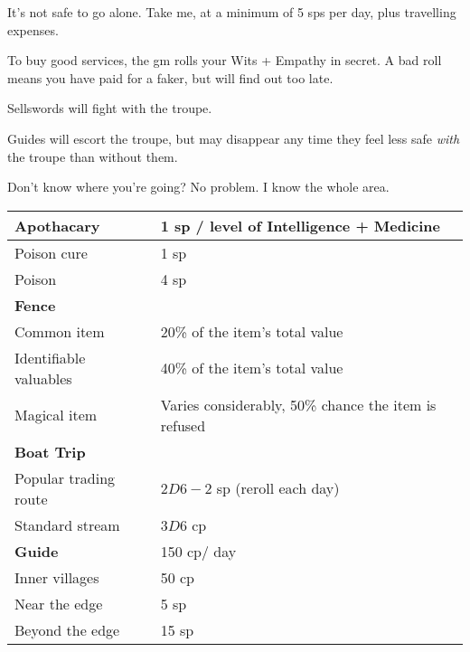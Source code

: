 \begin{multicols}{2}

\begin{boxtext}
  It's not safe to go alone.
  Take me, at a minimum of 5 \glspl{sp} per day, plus travelling expenses.
\end{boxtext}

To buy good services, the \gls{gm} rolls your Wits + Empathy in secret.
A bad roll means you have paid for a faker, but will find out too late.

Sellswords will fight with the troupe.

Guides will escort the troupe, but may disappear any time they feel less safe \emph{with} the troupe than without them.

\begin{boxtext}
  Don't know where you're going?
  No problem.
  I know the whole area.
\end{boxtext}

\noindent
\begin{tabularx}{\linewidth}{XX}

\textbf{Apothacary} & 1 \gls{sp} / level of Intelligence + Medicine \\\hline

Poison cure & 1 \gls{sp} \\

Poison & 4 \gls{sp} \\\hline

\textbf{Fence} & \\\hline

Common item & 20\% of the item's total value \\

Identifiable valuables & 40\% of the item's total value \\

Magical item & Varies considerably, 50\% chance the item is refused \\\hline

\textbf{Boat Trip} & \\\hline

Popular trading route & $2D6-2$ \gls{sp} (reroll each day) \\

Standard stream & $3D6$ \gls{cp} \\\hline

\textbf{Guide} &  150 \gls{cp}/ day \\\hline

  Inner \glspl{village} & 50 \gls{cp} \\
  Near the \gls{edge} & 5 \gls{sp} \\
  Beyond the \gls{edge} & 15 \gls{sp} \\


\end{tabularx}
\end{multicols}
